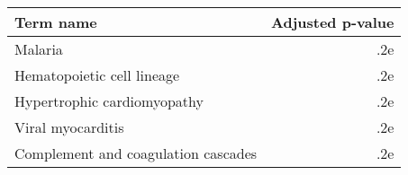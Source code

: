 \begin{tabular}{lr}
\toprule
                          Term name &  Adjusted p-value \\
\midrule
                            Malaria &               .2e \\
         Hematopoietic cell lineage &               .2e \\
        Hypertrophic cardiomyopathy &               .2e \\
                  Viral myocarditis &               .2e \\
Complement and coagulation cascades &               .2e \\
\bottomrule
\end{tabular}
